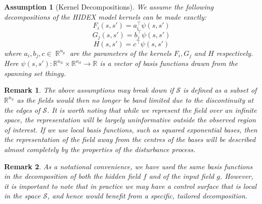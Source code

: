 \documentclass{IEEEtran}
\DeclareMathOperator{\R}{\mathbb{R}}
\DeclareMathOperator{\onto}{\rightarrow}
\newtheorem{remark}{Remark}
\newtheorem{assumption}{Assumption}
\begin{document}
\begin{assumption}[Kernel Decompositions]
	\label{ass:kerndecomp}
	We assume the following decompositions of the HIDEX model kernels can be made exactly:
	\begin{equation}
	F_i(s,s') = a_i^\top\psi(s,s')
\end{equation}
\begin{equation}
	G_j(s,s') = b_j^\top\psi(s,s')
\end{equation}
\begin{equation}
	H(s,s') = c^\top\psi(s,s')
\end{equation}
where $a_i, b_j, c \in \R^{n_y}$ are the parameters of the kernels $F_i, G_j$ and $H$ respectively. Here $\psi(s,s') : \mathbb{R}^{n_\mathcal{S}} \times \mathbb{R}^{n_\mathcal{S}} \onto \mathbb{R}$ is a vector of basis functions drawn from the spanning set thingy.
\end{assumption}

\begin{remark}
	The above assumptions may break down if $\mathcal{S}$ is defined as a subset of $\mathbb{R}^{n_\mathcal{S}}$ as the fields would then no longer be band limited due to the discontinuity at the edges of $\mathcal{S}$. It is worth noting that while we represent the field over an infinite space, the representation will be largely uninformative outside the observed region of interest. If we use local basis functions, such as squared exponential bases, then the representation of the field away from the centres of the bases will be described almost completely by the properties of the disturbance process.
\end{remark}

\begin{remark}
As a notational convenience, we have used the same basis functions in the decomposition of both the hidden field $f$ and of the input field $g$. However, it is important to note that in practice we may have a control surface that is local in the space $\mathcal{S}$, and hence would benefit from a specific, tailored decomposition. 
\end{remark}
\end{document}
